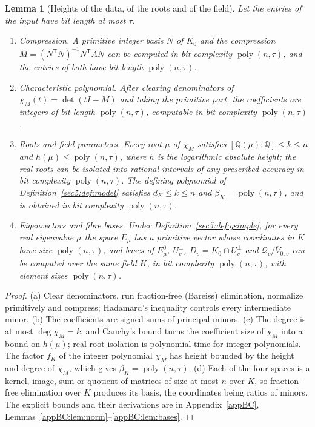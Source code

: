 \documentclass[journal]{IEEEtran}
\theoremstyle{plainn}
\newtheorem{lem}[thm]{Lemma}
\theoremstyle{remark}
\newcommand{\poly}{\operatorname{poly}}
\begin{document}
\begin{lem}[Heights of the data, of the roots and of the field]\label{sec5:lem:height}\label{sec5:lem:charpoly}\label{sec5:lem:roots}\label{sec5:lem:eigvec}
Let the entries of the input have bit length at most $\tau$.
\begin{enumerate}[label=(\alph*),leftmargin=*]
\item \emph{Compression.} A primitive integer basis $N$ of $K_0$ and the compression
$M=(N^{\mathsf T}N)^{-1}N^{\mathsf T}AN$ can be computed in bit complexity $\poly(n,\tau)$, and the
entries of both have bit length $\poly(n,\tau)$.
\item \emph{Characteristic polynomial.} After clearing denominators of $\chi_M(t)=\det(tI-M)$ and
taking the primitive part, the coefficients are integers of bit length $\poly(n,\tau)$, computable in
bit complexity $\poly(n,\tau)$.
\item \emph{Roots and field parameters.} Every root $\mu$ of $\chi_M$ satisfies
$[\mathbb{Q}(\mu):\mathbb{Q}]\le k\le n$ and $h(\mu)\le\poly(n,\tau)$, where $h$ is the logarithmic
absolute height; the real roots can be isolated into rational intervals of any prescribed accuracy in
bit complexity $\poly(n,\tau)$. The defining polynomial of Definition~\ref{sec5:def:model} satisfies
$d_K\le k\le n$ and $\beta_K=\poly(n,\tau)$, and is obtained in bit complexity $\poly(n,\tau)$.
\item \emph{Eigenvectors and fibre bases.} Under Definition~\ref{sec5:def:gsimple}, for every real
eigenvalue $\mu$ the space $E_\mu$ has a primitive vector whose coordinates in $K$ have size
$\poly(n,\tau)$, and bases of $E_\mu^0$, $U_v^\perp$, $D_v=K_0\cap U_v^\perp$ and
$\mathcal{Q}_v/\overline{V}_{0,v}$ can be computed over the same field $K$, in bit complexity
$\poly(n,\tau)$, with element sizes $\poly(n,\tau)$.
\end{enumerate}
\end{lem}

\begin{proof}
(a) Clear denominators, run fraction-free (Bareiss) elimination, normalize primitively and compress;
Hadamard's inequality controls every intermediate minor. (b) The coefficients are signed sums of
principal minors. (c) The degree is at most $\deg\chi_M=k$, and Cauchy's bound turns the coefficient
size of $\chi_M$ into a bound on $h(\mu)$; real root isolation is polynomial-time for integer
polynomials. The factor $f_K$ of the integer polynomial $\chi_M$ has height bounded by the height and
degree of $\chi_M$, which gives $\beta_K=\poly(n,\tau)$. (d) Each of the four spaces is a kernel, image,
sum or quotient of matrices of size at most $n$ over $K$, so fraction-free elimination over $K$
produces its basis, the coordinates being ratios of minors. The explicit bounds and their derivations
are in Appendix~\ref{appBC}, Lemmas~\ref{appBC:lem:norm}--\ref{appBC:lem:bases}.
\end{proof}
\end{document}
